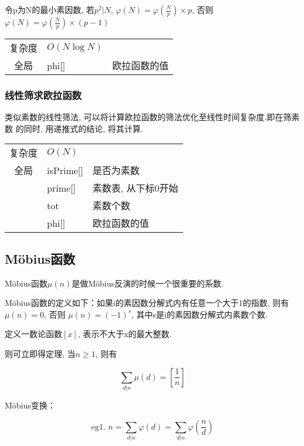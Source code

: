令p为N的最小素因数, 若$p^2|N$, $\varphi (N) = \varphi(\frac{N}{p}) \times p$, 
否则$\varphi (N) = \varphi(\frac{N}{p}) \times (p-1)$

\begin{longtable}{|c|l|l|}
复杂度 & $O(N\log N)$ &  \\
全局 & phi[] & 欧拉函数的值 \\ 
\end{longtable}



        \subsubsection{线性筛求欧拉函数}\small
类似素数的线性筛法, 可以将计算欧拉函数的筛法优化至线性时间复杂度.即在筛素数
的同时, 用递推式的结论, 将其计算.

\begin{longtable}{|c|l|l|}
复杂度 & $O(N)$ &  \\
全局 & isPrime[] & 是否为素数 \\
 & prime[] & 素数表, 从下标0开始 \\
 & tot & 素数个数 \\
 & phi[] & 欧拉函数的值 \\ 
\end{longtable}



    \subsection{M\"{o}bius函数}\small
M\"{o}bius函数$\mu (n)$是做M\"{o}bius反演的时候一个很重要的系数.

M\"{o}bius函数的定义如下：如果i的素因数分解式内有任意一个大于1的指数, 则有
$\mu (n) = 0$, 否则
$\mu (n) = (-1)^s$, 其中s是i的素因数分解式内素数个数.

定义一数论函数$[x]$, 表示不大于x的最大整数.

则可立即得定理, 当$n \geq 1$, 则有

\begin{equation}
\sum\limits_{d|n} \mu (d) = [\frac{1}{n}]
\end{equation}

M\"{o}bius变换：

\begin{equation}
\text{eg1.\ }n = \sum\limits_{d|n} \varphi (d) = \sum\limits_{d|n} \varphi (\frac{n}{d})
\end{equation}

